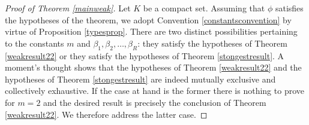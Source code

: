 \documentclass{article}
\theoremstyle{theorem}
\theoremstyle{remark}
\begin{document}
\begin{proof}[Proof of Theorem \ref{mainweak}]
Let $K$ be a compact set. Assuming that $\phi$ satisfies the hypotheses of the theorem, we adopt Convention \ref{constantsconvention} by virtue of Proposition \ref{typesprop}. There are two distinct possibilities pertaining to the constants $m$ and $\beta_1,\beta_2,\dots,\beta_R$: they satisfy the hypotheses of Theorem \ref{weakresult22} or they satisfy the hypotheses of Theorem \ref{stongestresult}. A moment's thought shows that the hypotheses of Theorem \ref{weakresult22} and the hypotheses of Theorem \ref{stongestresult} are indeed mutually exclusive and collectively exhaustive. If the case at hand is the former there is nothing to prove for $m=2$ and the desired result is precisely the conclusion of Theorem \ref{weakresult22}. We therefore address the latter case.  


\end{proof}
\end{document}
